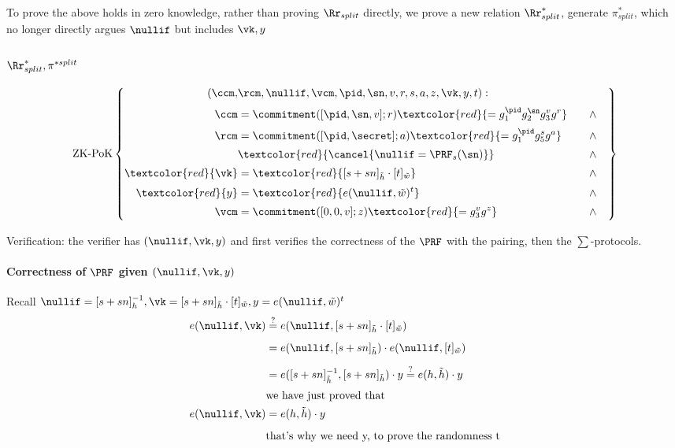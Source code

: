 \noindent To prove the above holds in zero knowledge, rather than proving $\Rr_{split}$ directly, we prove a new relation $\Rr^*_{split}$, generate $\pi^*_{split}$, which no longer directly argues $\nullif$ but includes $\vk, y$

\subsubsection{$\Rr^*_{split}, \pi^{*split}$}
\begin{equation*}
 \text{ZK-PoK}\left\{
    \begin{aligned}
        (\ccm, & \rcm, \nullif, \vcm, \pid, \sn, v, r, s, a, z, \vk, y, t ) : \\[2pt]
        \ccm &= \commitment([ \pid, \sn, v]; r)  \textcolor{red}{= g_1^{\pid}g_2^{\sn}g_3^vg^r} \quad & \wedge \quad \\[2pt]
        \rcm &= \commitment([ \pid, \secret]; a) \textcolor{red}{=g_1^{\pid}g_5^sg^a} \quad & \wedge \quad \\[2pt]
        &\textcolor{red}{\cancel{\nullif = \PRF_s(\sn)}} \qquad & \wedge \quad \\[2pt]
        \textcolor{red}{\vk} &= \textcolor{red}{[s + sn]_{\tilde{h}}\cdot [t]_{\tilde{w}}} \qquad & \wedge \quad \\[2pt]
        \textcolor{red}{y} &= \textcolor{red}{e(\nullif, \tilde{w})^t} \qquad & \wedge \quad \\[2pt]
        \vcm &= \commitment([0,0,v]; z) \textcolor{red}{=g_3^vg^z} \qquad & \wedge \quad \\[2pt]
    \end{aligned}
\right\}
\end{equation*}

\noindent Verification: the verifier has $(\nullif, \vk, y)$ and first verifies the correctness of the $\PRF$ with the pairing, then the $\sum$-protocols.

\paragraph{Correctness of $\PRF$ given $(\nullif, \vk, y)$}
Recall $\nullif = [s + sn]_h^{-1}, \vk = [s + sn]_{\tilde{h}}\cdot [t]_{\tilde{w}}, y = e(\nullif, \tilde{w})^t $
\[
    \begin{aligned}
    e(\nullif, \vk) &\stackrel{?}{=} e(\nullif, [s + sn]_{\tilde{h}} \cdot [t]_{\tilde{w}}) \\[5pt]
    &= e(\nullif, [s + sn]_{\tilde{h}}) \cdot e(\nullif, [t]_{\tilde{w}}) \\[5pt]
    &= e([s + sn]_{\tilde{h}}^{-1}, [s + sn]_{\tilde{h}}) \cdot y \stackrel{?}{=} e(h, \tilde{h}) \cdot y\\[2pt]
    &\text{we have just proved that} \\
    e(\nullif, \vk) &= e(h, \tilde{h}) \cdot y\\[5pt]
    &\text{that's why we need y, to prove the randomness t} \\
\end{aligned}
\]


